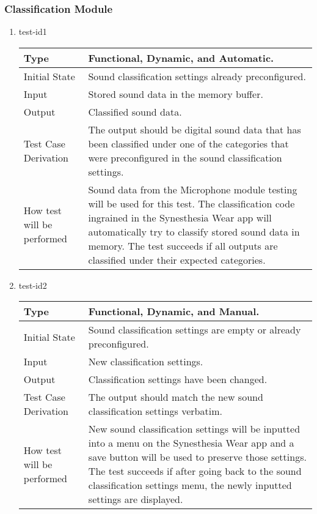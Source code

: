 \documentclass[12pt, titlepage]{article}
\begin{document}
\subsubsection{Classification Module}

\begin{enumerate}

\item{test-id1\\}

\begin{tabular}{ |p{5cm}||p{7cm}| }
    \hline
    Type & Functional, Dynamic, and Automatic. \\
    \hline
    Initial State  &  Sound classification settings already preconfigured.\\
    \hline
    Input &   Stored sound data in the memory buffer.  \\
    \hline
    Output &   Classified sound data.  \\
    \hline
    Test Case Derivation &   The output should be digital sound data that has been classified under one of the categories that were preconfigured in the sound classification settings.\\
    \hline
    How test will be performed & Sound data from the Microphone module testing will be used for this test. The classification code ingrained in the Synesthesia Wear app will automatically try to classify stored sound data in memory. The test succeeds if all outputs are classified under their expected categories.\\
    \hline
\end{tabular}

\item{test-id2\\}

\begin{tabular}{ |p{5cm}||p{7cm}| }
    \hline
    Type & Functional, Dynamic, and Manual. \\
    \hline
    Initial State  &  Sound classification settings are empty or already preconfigured. \\
    \hline
    Input &   New classification settings.  \\
    \hline
    Output &   Classification settings have been changed.  \\
    \hline
    Test Case Derivation &   The output should match the new sound classification settings verbatim.\\
    \hline
    How test will be performed & New sound classification settings will be inputted into a menu on the Synesthesia Wear app and a save button will be used to preserve those settings. The test succeeds if after going back to the sound classification settings menu, the newly inputted settings are displayed.\\
    \hline
\end{tabular}

\end{enumerate}
\end{document}
